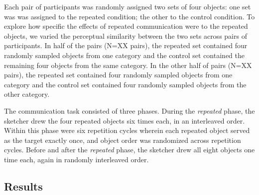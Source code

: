 \documentclass[10pt,letterpaper]{article}
\begin{document}
Each pair of participants was randomly assigned two sets of four objects: one set was was assigned to the repeated condition; the other to the control condition.
To explore how specific the effects of repeated communication were to the repeated objects, we varied the perceptual similarity between the two sets across pairs of participants. 
In half of the pairs (N=XX pairs), the repeated set contained four randomly sampled objects from one category and the control set contained the remaining four objects from the same category. 
In the other half of pairs (N=XX pairs), the repeated set contained four randomly sampled objects from one category and the control set contained four randomly sampled objects from the other category.


The communication task consisted of three phases. 
During the \textit{repeated} phase, the sketcher drew the four repeated objects six times each, in an interleaved order.
Within this phase were six repetition cycles wherein each repeated object served as the target exactly once, and object order was randomized across repetition cycles. 
Before and after the \textit{repeated} phase, the sketcher drew all eight objects one time each, again in randomly interleaved order. 


\subsection{Results}
\end{document}

